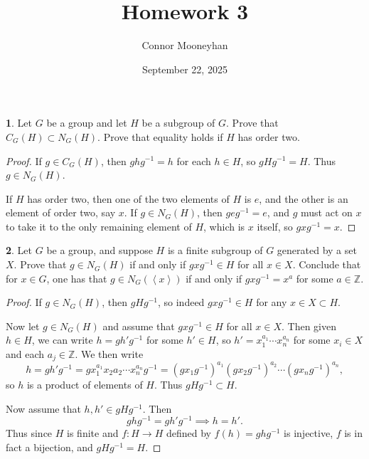 \documentclass[12pt]{article}
\title{Homework 3}
\author{Connor Mooneyhan}
\date{September 22, 2025}
\theoremstyle{definition}
\newtheorem{ex}{}
\begin{document}
\maketitle

\begin{ex}
	Let $G$ be a group and let $H$ be a subgroup of $G$.
	Prove that $C_G(H) \subset N_G(H)$.
	Prove that equality holds if $H$ has order two.
\end{ex}
\begin{proof}
	If $g \in C_G(H)$, then $ghg^{-1} = h$ for each $h \in H$, so $gHg^{-1} = H$.
	Thus $g \in N_G(H)$.

	If $H$ has order two, then one of the two elements of $H$ is $e$, and the other is an element of order two, say $x$.
	If $g \in N_G(H)$, then $geg^{-1} = e$, and $g$ must act on $x$ to take it to the only remaining element of $H$, which is $x$ itself, so $gxg^{-1} = x$.
\end{proof}

\begin{ex}
	Let $G$ be a group, and suppose $H$ is a finite subgroup of $G$ generated by a set $X$.
	Prove that $g \in N_G(H)$ if and only if $gxg^{-1} \in H$ for all $x \in X$.
	Conclude that for $x \in G$, one has that $g \in N_G(\left\langle x \right\rangle)$ if and only if $gxg^{-1} = x^a$ for some $a \in \mathbb{Z}$.
\end{ex}
\begin{proof}
	If $g \in N_G(H)$, then $gHg^{-1}$, so indeed $gxg^{-1} \in H$ for any $x \in X \subset H$.

	Now let $g \in N_G(H)$ and assume that $gxg^{-1} \in H$ for all $x \in X$.
	Then given $h \in H$, we can write $h = gh' g^{-1}$ for some $h' \in H$, so $h' = x_1^{a_1} \cdots x_n^{a_n}$ for some $x_i \in X$ and each $a_j \in \mathbb{Z}$.
	We then write \begin{equation*}
		h = gh'g^{-1} = gx_1^{a_1}x_2{a_2}\cdots x_n^{a_n}g^{-1} = (gx_1g^{-1})^{a_1}(gx_2g^{-1})^{a_2}\cdots (gx_ng^{-1})^{a_n},
	\end{equation*}
	so $h$ is a product of elements of $H$.
	Thus $gHg^{-1} \subset H$.

	Now assume that $h, h' \in gHg^{-1}$.
	Then \begin{equation*}
		ghg^{-1} = gh'g^{-1} \implies h = h'.
	\end{equation*}
	Thus since $H$ is finite and $f: H \to H$ defined by $f(h) = ghg^{-1}$ is injective, $f$ is in fact a bijection, and $gHg^{-1} = H$.
\end{proof}
\end{document}
